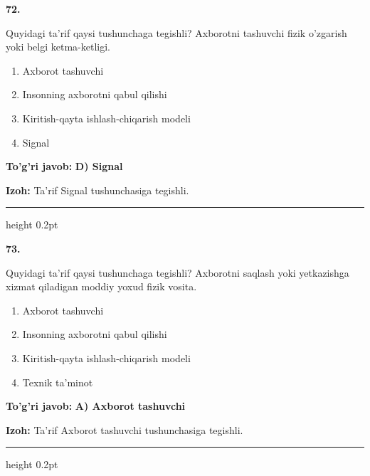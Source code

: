 \documentclass[10pt,a4paper,oneside]{article}
\begin{document}
\noindent\textbf{\color{ink}72.}
\par
Quyidagi ta'rif qaysi tushunchaga tegishli? Axborotni tashuvchi fizik o'zgarish yoki belgi ketma-ketligi.
\begin{enumerate}[label=\Alph*),leftmargin=9mm]
\item Axborot tashuvchi
\item Insonning axborotni qabul qilishi
\item Kiritish-qayta ishlash-chiqarish modeli
\item Signal
\end{enumerate}
\begin{tcolorbox}[enhanced,breakable,colback=teal!4,colframe=teal!50!black,boxrule=0.5pt,arc=1.1mm,left=3mm,right=3mm,top=1.7mm,bottom=1.7mm,before skip=2mm,after skip=2mm]
\textbf{\color{teal}To'g'ri javob:} \textbf{D) Signal}
\par\smallskip
\textbf{Izoh:} Ta'rif Signal tushunchasiga tegishli.
\end{tcolorbox}
\vspace{2mm}\hrule height 0.2pt \vspace{3mm}

\noindent\textbf{\color{ink}73.}
\par
Quyidagi ta'rif qaysi tushunchaga tegishli? Axborotni saqlash yoki yetkazishga xizmat qiladigan moddiy yoxud fizik vosita.
\begin{enumerate}[label=\Alph*),leftmargin=9mm]
\item Axborot tashuvchi
\item Insonning axborotni qabul qilishi
\item Kiritish-qayta ishlash-chiqarish modeli
\item Texnik ta'minot
\end{enumerate}
\begin{tcolorbox}[enhanced,breakable,colback=teal!4,colframe=teal!50!black,boxrule=0.5pt,arc=1.1mm,left=3mm,right=3mm,top=1.7mm,bottom=1.7mm,before skip=2mm,after skip=2mm]
\textbf{\color{teal}To'g'ri javob:} \textbf{A) Axborot tashuvchi}
\par\smallskip
\textbf{Izoh:} Ta'rif Axborot tashuvchi tushunchasiga tegishli.
\end{tcolorbox}
\vspace{2mm}\hrule height 0.2pt \vspace{3mm}
\end{document}
